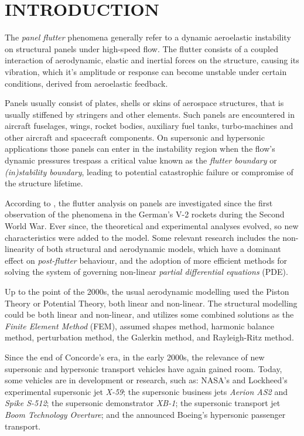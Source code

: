\section{INTRODUCTION}

The \emph{panel flutter} phenomena generally refer to a dynamic aeroelastic instability on structural panels under high-speed flow.
The flutter consists of a coupled interaction of aerodynamic,
elastic and inertial forces on the structure, causing its vibration,
which it's amplitude or response can become unstable under certain conditions,
derived from aeroelastic feedback. \citep{fung_introduction_2008}

Panels usually consist of plates, shells or skins of aerospace structures,
that is usually stiffened by stringers and other elements.
Such panels are encountered in aircraft fuselages, wings,
rocket bodies, auxiliary fuel tanks, turbo-machines and other aircraft and spacecraft components.
On supersonic and hypersonic applications those panels can enter in the instability region
when the flow's dynamic pressures trespass a critical value known as the \emph{flutter boundary} or \emph{(in)stability boundary},
leading to potential catastrophic failure or compromise of the structure lifetime.
\citep{dowell_aeroelasticity_1974}

According to \citet{pegado_metodo_2003}, the flutter analysis on panels
are investigated since the first observation of the phenomena in the German's V-2 rockets during the Second World War.
Ever since, the theoretical and experimental analyses evolved, so new characteristics were added to the model.
Some relevant research includes the non-linearity of both structural and aerodynamic models, which have a dominant effect on
\emph{post-flutter} behaviour,
and the adoption of more efficient methods for solving the system of governing non-linear \emph{partial differential equations} (PDE).

Up to the point of the 2000s, the usual aerodynamic modelling used the Piston Theory or Potential Theory,
both linear and non-linear. The structural modelling could be both linear and non-linear,
and utilizes some combined solutions as the \emph{Finite Element Method} (FEM), assumed shapes method,
harmonic balance method, perturbation method, the Galerkin method, and Rayleigh-Ritz method.

Since the end of Concorde's era, in the early 2000s,
the relevance of new supersonic and hypersonic transport vehicles have again gained room.
Today, some vehicles are in development or research, such as:
NASA's and Lockheed's experimental supersonic jet \emph{X-59};
the supersonic business jets \emph{Aerion AS2} and \emph{Spike S-512};
the supersonic demonstrator \emph{XB-1};
the supersonic transport jet \emph{Boom Technology Overture};
and the announced Boeing's hypersonic passenger transport.

